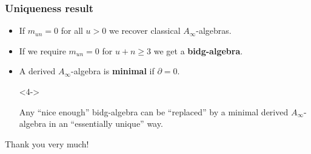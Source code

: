 \documentclass{beamer}
\theoremstyle{definition}
\begin{document}
\begin{frame}
\frametitle{Uniqueness result}
\begin{itemize}
\item If $m_{un}=0$ for all $u>0$ we recover classical $A_\infty$-algebras.
\item<2-> If we require $m_{un}=0$ for $u+n\geq 3$ we get a \textbf{bidg-algebra}. %
\item<3-> A derived $A_\infty$-algebra is \textbf{minimal} if $\partial=0$. 
\item[]<4->
\begin{theorem}[Sagave]
Any ``nice enough'' bidg-algebra can be ``replaced'' by a minimal derived $A_\infty$-algebra in an ``essentially unique'' way.
\end{theorem}
\end{itemize}
\end{frame}
\begin{frame}
\begin{center}
\Huge{Thank you very much!}
\end{center}
\end{frame}
\end{document}
